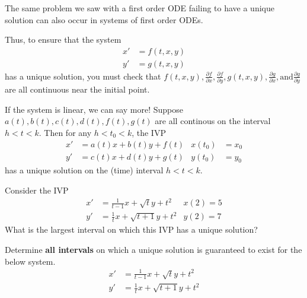 \begin{applicationActivities}

\begin{observation}
The same problem we saw with a first order ODE failing to have a unique solution can also occur in systems of first order ODEs.

\vfill

Thus, to ensure that the system
\begin{align*}
x' &= f(t,x,y) \\
y' &= g(t,x,y) 
\end{align*}
has a unique solution, you must check that \( f(t,x,y), \frac{\partial f}{\partial x}, \frac{\partial f}{\partial y}, g(t,x,y), \frac{\partial g}{\partial x}, \text{and} \frac{\partial g}{\partial y}\) are all continuous near the initial point.
\end{observation}

\begin{observation}
If the system is linear, we can say more!
\vfill
Suppose \( a(t), b(t), c(t), d(t), f(t), g(t)\) are all continous on the interval \( h<t<k\).  Then for any \(h<t_0<k\), the IVP
\begin{align*}
x' &= a(t)x+b(t)y + f(t)  & x(t_0) &=  x_0\\
y' &= c(t)x+d(t)y + g(t) & y(t_0) &= y_0 
\end{align*}
has a unique solution on the (time) interval \(h<t<k\).
\end{observation}


\begin{activity}{5}
Consider the IVP
\begin{align*}
x' &= \frac{1}{t-1} x + \sqrt{t} y + t^2  & x(2)=5 \\
y' &= \frac{1}{t} x + \sqrt{t+1} y + t^2  & y(2)=7 
\end{align*}
\vfill
What is the largest interval on which this IVP has a unique solution?
\end{activity}

\begin{activity}{5}
Determine \textbf{all intervals} on which a unique solution is guaranteed to exist for the below system.
\begin{align*}
x' &= \frac{1}{t-1} x + \sqrt{t} y + t^2  \\
y' &= \frac{1}{t} x + \sqrt{t+1} y + t^2 
\end{align*}

\end{activity}


\end{applicationActivities}

